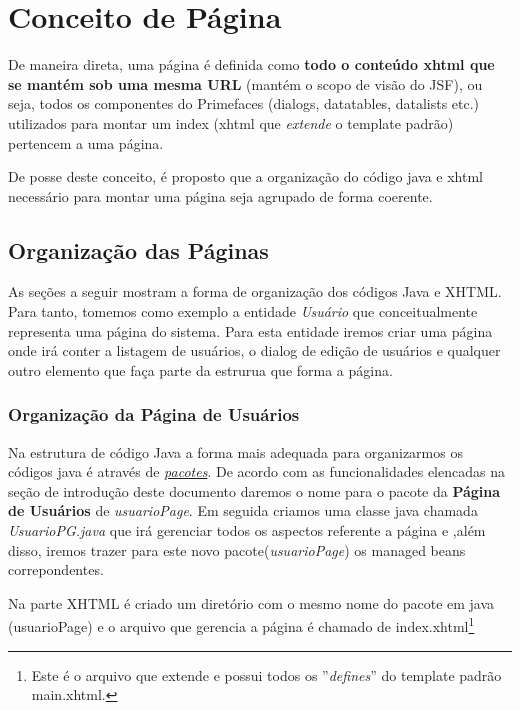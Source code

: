 \documentclass[a4paper,10pt]{article}
\begin{document}
\section{Conceito de Página}
De maneira direta, uma página é definida como \textbf{ todo o conteúdo xhtml que se
mantém sob uma mesma URL} (mantém o scopo de visão do JSF), ou seja, todos os
componentes do Primefaces (dialogs, datatables, datalists etc.) utilizados para
montar um index (xhtml que \emph{extende} o template padrão) pertencem a uma
página.

De posse deste conceito, é proposto que a organização do código java e
xhtml necessário para montar uma página seja agrupado de forma coerente.
% 
%
\subsection{Organização das Páginas}
As seções a seguir mostram a forma de organização dos códigos Java e XHTML.
Para tanto, tomemos como exemplo a entidade \emph{Usuário} que conceitualmente
representa uma página do sistema.
Para esta entidade iremos criar uma página onde irá conter a listagem de usuários, o dialog de
edição de usuários e qualquer outro elemento que faça parte da estrurua que
forma a página.
% 
%
\subsubsection{Organização da Página de Usuários}
\label{org-pg-user} Na estrutura de código Java a forma mais adequada para organizarmos os códigos
java é através de \underline{\emph{pacotes}}. De acordo com as funcionalidades
elencadas na seção de introdução deste documento daremos o nome para o pacote da
\textbf{Página de Usuários} de \emph{usuarioPage}. Em seguida criamos uma classe
java chamada \emph{UsuarioPG.java} que irá gerenciar todos os aspectos referente
a página e ,além disso, iremos trazer para este novo pacote(\emph{usuarioPage})
os managed beans correpondentes.

Na parte XHTML é criado um diretório com o mesmo nome do pacote em java
(usuarioPage) e o arquivo que gerencia a página é chamado de
index.xhtml\footnote{Este é o arquivo que extende e possui todos os
''\emph{defines}'' do  template padrão main.xhtml.} 
\end{document}
